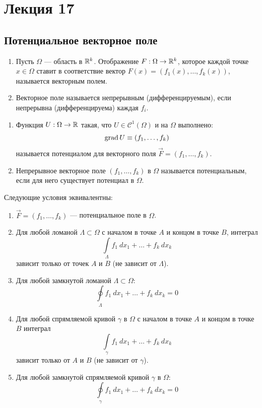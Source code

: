 \section{Лекция 17}
\subsection{Потенциальное векторное поле}
\begin{definition}\tab
    \begin{enumerate}
        \item Пусть $\Omega$ --- область в $\mathbb{R}^k$. Отображение $F:\Omega\to \mathbb{R}^k$, которое каждой точке $x\in \Omega$ ставит в соответствие вектор $F(x)=(f_1(x),\dots,f_k(x))$, называется векторным полем.
        \item Векторное поле называется непрерывным (дифференцируемым), если непрерывна (дифференцируема) каждая $f_i$.
    \end{enumerate}
\end{definition}
\begin{definition}\tab
    \begin{enumerate}
        \item Функция $U:\Omega\to \mathbb{R}$ такая, что $U\in \mathcal{C}^1(\Omega)$ и на $\Omega$ выполнено:
        \[\operatorname*{grad}{U}\equiv (f_1,\dots,f_k)\]
        называется потенциалом для векторного поля $\vec{F}=(f_1,\dots,f_k)$.
        \item Непрерывное векторное поле $(f_1,\dots,f_k)$ в $\Omega$ называется потенциальным, если для него существует потенциал в $\Omega$.
    \end{enumerate}
\end{definition}
\begin{theorem}\label{potential}
    Следующие условия эквивалентны:
    \begin{enumerate}
        \item $\vec{F}=(f_1,\dots,f_k)$ --- потенциальное поле в $\Omega$.
        \item Для любой ломаной $\Lambda\subset \Omega$ с началом в точке $A$ и концом в точке $B$, интеграл 
        \[\int\limits_{\Lambda}f_1\ dx_1+\dots+f_k\ dx_k\]
        зависит только от точек $A$ и $B$ (не зависит от $\Lambda$).
        \item Для любой замкнутой ломаной $\Lambda\subset\Omega$:
        \[\oint\limits_{\Lambda}f_1\ dx_1+\dots+f_k\ dx_k=0\]
        \item Для любой спрямляемой кривой $\gamma$ в $\Omega$ с началом в точке $A$ и концом в точке $B$ интеграл
        \[\int\limits_{\gamma}f_1\ dx_1+\dots+f_k\ dx_k\]
        зависит только от $A$ и $B$ (не зависит от $\gamma$).
        \item Для любой замкнутой спрямляемой кривой $\gamma$ в $\Omega$:
        \[\oint\limits_{\gamma}f_1\ d x_1+\dots+f_k\ dx_k=0\]
    \end{enumerate}
\end{theorem}
